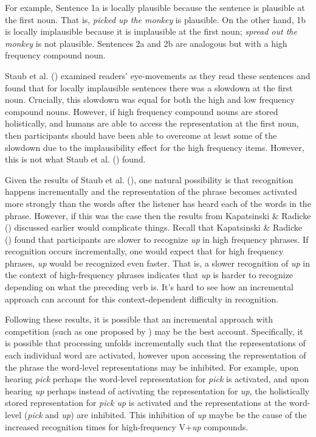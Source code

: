 \documentclass[
  12pt,
  letterpaper,
]{scrreprt}
\begin{document}
For example, Sentence 1a is locally plausible because the sentence is
plausible at the first noun. That is, \emph{picked up the monkey} is
plausible. On the other hand, 1b is locally implausible because it is
implausible at the first noun; \emph{spread out the monkey} is not
plausible. Sentences 2a and 2b are analogous but with a high frequency
compound noun.

Staub et al. ()
examined readers' eye-movements as they read these sentences and found
that for locally implausible sentences there was a slowdown at the first
noun. Crucially, this slowdown was equal for both the high and low
frequency compound nouns. However, if high frequency compound nouns are
stored holistically, and humans are able to access the representation at
the first noun, then participants should have been able to overcome at
least some of the slowdown due to the implausibility effect for the high
frequency items. However, this is not what Staub et al.
() found.

Given the results of Staub et al.
(), one natural
possibility is that recognition happens incrementally and the
representation of the phrase becomes activated more strongly than the
words after the listener has heard each of the words in the phrase.
However, if this was the case then the results from Kapatsinski \&
Radicke ()
discussed earlier would complicate things. Recall that Kapatsinski \&
Radicke ()
found that participants are slower to recognize \emph{up} in high
frequency phrases. If recognition occurs incrementally, one would expect
that for high frequency phrases, \emph{up} would be recognized even
faster. That is, a slower recognition of \emph{up} in the context of
high-frequency phrases indicates that \emph{up} is harder to recognize
depending on what the preceding verb is. It's hard to see how an
incremental approach can account for this context-dependent difficulty
in recognition.

Following these results, it is possible that an incremental approach
with competition (such as one proposed by
)
may be the best account. Specifically, it is possible that processing
unfolds incrementally such that the representations of each individual
word are activated, however upon accessing the representation of the
phrase the word-level representations may be inhibited. For example,
upon hearing \emph{pick} perhaps the word-level representation for
\emph{pick} is activated, and upon hearing \emph{up} perhaps instead of
activating the representation for \emph{up}, the holistically stored
representation for \emph{pick up} is activated and the representations
at the word-level (\emph{pick} and \emph{up}) are inhibited. This
inhibition of \emph{up} maybe be the cause of the increased recognition
times for high-frequency V+\emph{up} compounds.
\end{document}
